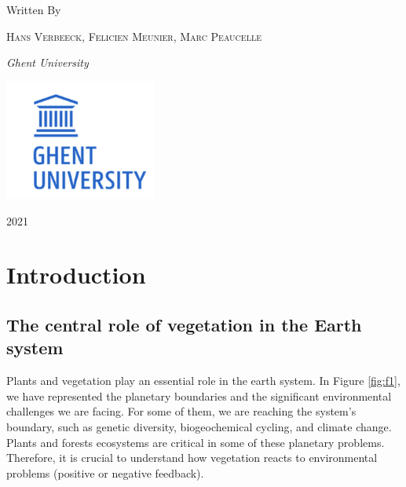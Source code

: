 \documentclass[12pt,oneside]{book}
\begin{document}
\begin{titlepage}
	Written By
	
	\vspace{0.5\baselineskip} %
	
	{\scshape Hans Verbeeck, Felicien Meunier, Marc Peaucelle \\} %
	
	\vspace{0.5\baselineskip} %
	
	\textit{Ghent University \\} %
	
	\vfill %
	
	
	
	\includegraphics[width = 50mm]{figures/UGhent2.png}
	
	\vspace{0.3\baselineskip} %
	
	2021 %
	

\end{titlepage}

{
\setcounter{tocdepth}{1}
\tableofcontents
}
\mainmatter

\chapter{Introduction}\label{intro}

\section{The central role of vegetation in the Earth
system}\label{the-central-role-of-vegetation-in-the-earth-system}

Plants and vegetation play an essential role in the earth system. In
Figure \ref{fig:f1}, we have represented the planetary boundaries and
the significant environmental challenges we are facing. For some of
them, we are reaching the system's boundary, such as genetic diversity,
biogeochemical cycling, and climate change. Plants and forests
ecosystems are critical in some of these planetary problems. Therefore,
it is crucial to understand how vegetation reacts to environmental
problems (positive or negative feedback).
\end{document}

